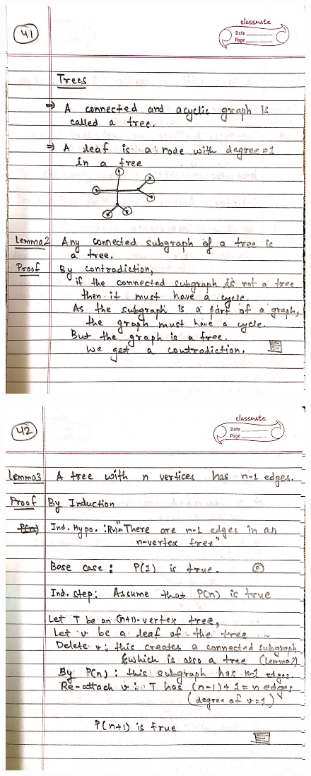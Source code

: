 \begin{figure}[H]
    \centering
    \includegraphics[scale=0.25]{"./MIT-6.042J/MIT-6042J-041"}
\end{figure}
\newpage
\begin{figure}[H]
    \centering
    \includegraphics[scale=0.25]{"./MIT-6.042J/MIT-6042J-042"}
\end{figure}
